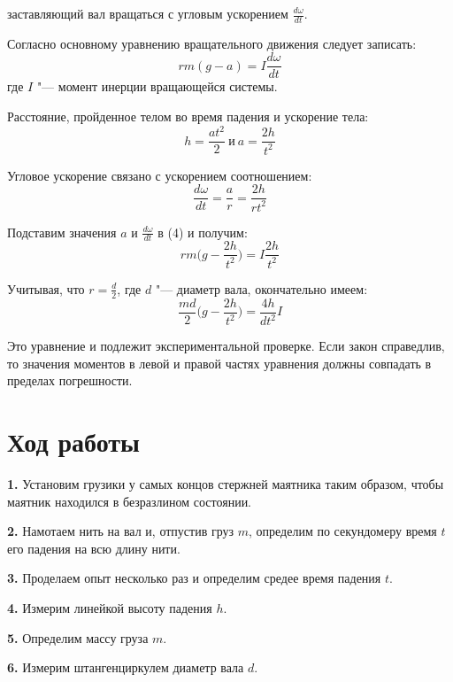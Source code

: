 \documentclass{article}
\begin{document}
заставляющий вал вращаться с угловым ускорением
$\frac{d\omega}{dt}$.

Согласно основному уравнению вращательного движения следует
записать:
\begin{equation}
    rm(g-a) = I\frac{d\omega}{dt} 
\end{equation}
где $I$ "--- момент инерции вращающейся системы.

Расстояние, пройденное телом во время падения и
ускорение тела:
\begin{equation}
    h = \frac{at^2}{2}~\text{и}~a = \frac{2h}{t^2}
\end{equation}

Угловое ускорение связано с ускорением соотношением: 
\begin{equation}
    \frac{d\omega}{dt} = \frac{a}{r} = \frac{2h}{rt^2}
\end{equation}

Подставим значения $a$ и $\frac{d\omega}{dt}$ в (4) и получим:
\begin{equation}
    rm\Big(g-\frac{2h}{t^2}\Big) = I\frac{2h}{t^2}
\end{equation}

Учитывая, что $r=\frac{d}{2}$, где $d$ "--- диаметр вала,
окончательно имеем:
\begin{equation}
    \frac{md}{2}\Big(g-\frac{2h}{t^2}\Big) = \frac{4h}{dt^2}I
\end{equation}

Это уравнение и подлежит экспериментальной проверке. Если
закон справедлив, то значения моментов  в левой и правой
частях уравнения должны совпадать в пределах погрешности.

\section{Ход работы}
\textbf{1.} Установим грузики у самых концов стержней маятника таким
образом, чтобы маятник находился в безразлином состоянии.

\textbf{2.} Намотаем нить на вал и, отпустив груз $m$, определим по
секундомеру время $t$ его падения на всю длину нити.

\textbf{3.} Проделаем опыт несколько раз и определим средее время
падения $t$.

\textbf{4.} Измерим линейкой высоту падения $h$.

\textbf{5.} Определим массу груза $m$.

\textbf{6.} Измерим штангенциркулем диаметр вала $d$.
\end{document}
